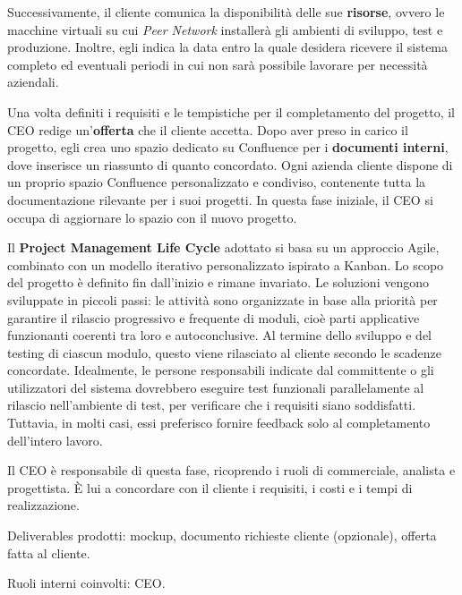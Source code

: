     Successivamente, il cliente comunica la disponibilità delle sue \textbf{risorse}, ovvero le macchine virtuali su cui \textit{Peer Network}
    installerà gli ambienti di sviluppo, test e produzione. Inoltre, egli indica la data entro la quale desidera ricevere il sistema completo
    ed eventuali periodi in cui non sarà possibile lavorare per necessità aziendali.

    Una volta definiti i requisiti e le tempistiche per il completamento del progetto, il CEO redige un’\textbf{offerta} che il cliente
    accetta. Dopo aver preso in carico il progetto, egli crea uno spazio dedicato su Confluence per i \textbf{documenti interni}, dove
    inserisce un riassunto di quanto concordato. Ogni azienda cliente dispone
    di un proprio spazio Confluence personalizzato e condiviso, contenente tutta la documentazione rilevante per i suoi progetti.
    In questa fase iniziale, il CEO si occupa di aggiornare lo spazio con il nuovo progetto.

    Il \textbf{Project Management Life Cycle} adottato si basa su un approccio Agile, combinato con un modello iterativo personalizzato
    ispirato a Kanban. Lo scopo del progetto è definito fin dall'inizio e rimane invariato. Le soluzioni vengono sviluppate in
    piccoli passi: le attività sono organizzate in base alla priorità per garantire il rilascio progressivo e frequente di moduli,
    cioè parti applicative funzionanti coerenti tra loro e autoconclusive. Al termine dello sviluppo e del testing di ciascun modulo,
    questo viene rilasciato al cliente secondo le scadenze concordate. Idealmente, le persone responsabili indicate dal committente o
    gli utilizzatori del sistema dovrebbero eseguire test funzionali
    parallelamente al rilascio nell’ambiente di test, per verificare che i requisiti siano soddisfatti. Tuttavia, in molti casi, essi
    preferisco fornire feedback solo al completamento dell'intero lavoro.

    Il CEO è responsabile di questa fase, ricoprendo i ruoli di commerciale, analista e progettista. È lui a concordare con il cliente i requisiti, i costi e i tempi di realizzazione.

    Deliverables prodotti: mockup, documento richieste cliente (opzionale), offerta fatta al cliente.

    Ruoli interni coinvolti: CEO.

